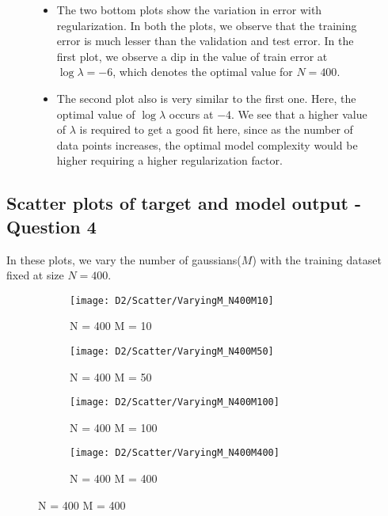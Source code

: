 \documentclass{article}
\begin{document}
\begin{figure}[H]
\begin{itemize}
\item The two bottom plots show the variation in error with regularization.
In both the plots, we observe that the training error is much lesser than the validation and test error. In the first plot, we observe a dip in the value of train error at $\log {\lambda} = -6 $, which denotes the optimal value for $N = 400$. 
\item The second plot also is very similar to the first one. Here, the optimal value of $\log{\lambda}$ occurs at $-4$. We see that a higher value of $\lambda$ is required to get a good fit here, since as the number of data points increases, the optimal model complexity would be higher requiring a higher regularization factor.
\end{itemize}


\end{figure}



\subsection{Scatter plots of target and model output - Question 4}

In these plots, we vary the number of gaussians($M$) with the training dataset fixed at size $N=400$. 

\begin{figure}[H]

\begin{subfigure}{.5\textwidth}
\centering
\texttt{[image: D2/Scatter/VaryingM\_N400M10]}	
\caption{N = 400 M = 10}
\end{subfigure}
\begin{subfigure}{.5\textwidth}
\texttt{[image: D2/Scatter/VaryingM\_N400M50]}
\caption{N = 400 M = 50}
\end{subfigure}


\begin{subfigure}{.5\textwidth}
\centering
\texttt{[image: D2/Scatter/VaryingM\_N400M100]}
\caption{N = 400 M = 100}
\end{subfigure}
\begin{subfigure}{.5\textwidth}
\texttt{[image: D2/Scatter/VaryingM\_N400M400]}
\caption{N = 400 M = 400}
\end{subfigure}


\end{figure}
\end{document}
